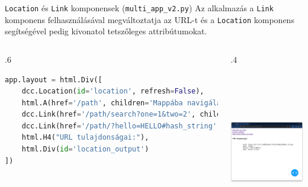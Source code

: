 \documentclass[english, aspectratio=169]{beamer}
\begin{document}
	\begin{frame}[fragile]{\texttt{Location} és \texttt{Link} komponensek (\texttt{multi\_app\_v2.py})}
		Az alkalmazás a \texttt{Link} komponens felhasználásával megváltoztatja az URL-t és a \texttt{Location} komponens segítségével pedig kivonatol tetszőleges attribútumokat.
		\begin{columns}
			\begin{column}{.6\textwidth}
				\begin{lstlisting}[language=python]
app.layout = html.Div([
	dcc.Location(id='location', refresh=False),
	html.A(href='/path', children='Mappába navigálás'),
	dcc.Link(href='/path/search?one=1&two=2', children='Keresés indítása'),
	dcc.Link(href='/path/?hello=HELLO#hash_string', children='Hash alapú oldalra navigálás'),
	html.H4("URL tulajdonságai:"),
	html.Div(id='location_output')
])
				\end{lstlisting}
			\end{column}
			\begin{column}{.4\textwidth}
				\begin{center}
					\includegraphics[width=6cm, height=7cm, keepaspectratio]{images/adv_6.png}
				\end{center}
			\end{column}
		\end{columns}
	\end{frame}
	
\end{document}
